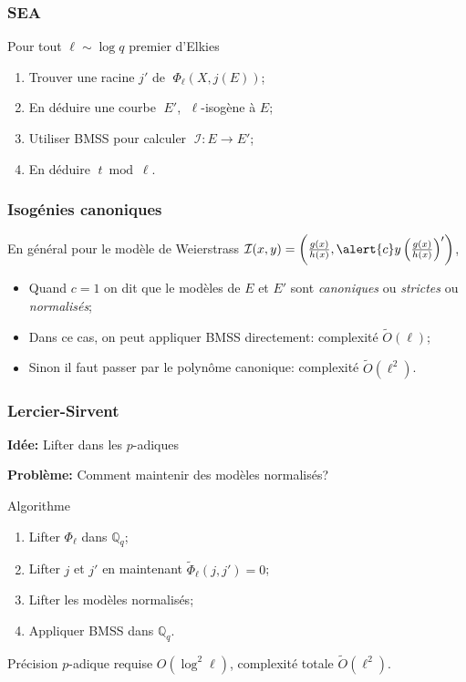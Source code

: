 \documentclass[10pt]{beamer}
\newcommand{\Q}{\mathbb{Q}}  %
\newcommand{\0}{\mathcal{O}}  %
\newcommand{\isog}[1]{\mathcal{#1}}  %
\newcommand{\I}{\isog{I}}  %
\newcommand{\tildO}{\tilde{O}}  %
\begin{document}

\begin{frame}
  \frametitle{SEA}

  Pour tout $\ell\sim\log q$ premier d'Elkies
  \begin{enumerate}
  \item Trouver une racine $j'$ de $\;\Phi_\ell(X,j(E))$;
  \item \alert<2>{En déduire une courbe $\;E'$, $\;\ell$-isogène à $E$};
  \item Utiliser BMSS pour calculer $\;\I:E\to E'$;
  \item En déduire $\;t\bmod\ell$.
  \end{enumerate}
\end{frame}


\begin{frame}
  \frametitle{Isogénies canoniques}

  En général pour le modèle de Weierstrass $\I(x,y) =
  \left(\frac{g(x)}{h(x)},
    \alert{c}y\left(\frac{g(x)}{h(x)}\right)'\right)$,

  \begin{itemize}
  \item Quand $c=1$ on dit que le modèles de $E$ et $E'$ sont
    \emph{canoniques} ou \emph{strictes} ou \emph{normalisés};
  \item Dans ce cas, on peut appliquer BMSS directement: complexité \alert{$\tildO(\ell)$};
  \item Sinon il faut passer par le polynôme canonique: complexité \alert{$\tildO(\ell^2)$}.
  \end{itemize}
\end{frame}


\begin{frame}
  \frametitle{Lercier-Sirvent}

  \begin{center}
    \textbf{Idée:} Lifter dans les $p$-adiques

    \textbf{Problème:} Comment maintenir des modèles normalisés?
  \end{center}

  \begin{block}{Algorithme}
    \begin{enumerate}
    \item Lifter $\Phi_\ell$ dans $\Q_q$;
    \item Lifter $j$ et $j'$ en maintenant $\tilde{\Phi}_\ell(j,j')=0$;
    \item Lifter les modèles normalisés;
    \item Appliquer BMSS dans $\Q_q$.
    \end{enumerate}
    Précision $p$-adique requise $O(\log^2\ell)$, complexité totale $\tildO(\ell^2)$.
  \end{block}
\end{frame}
\end{document}
